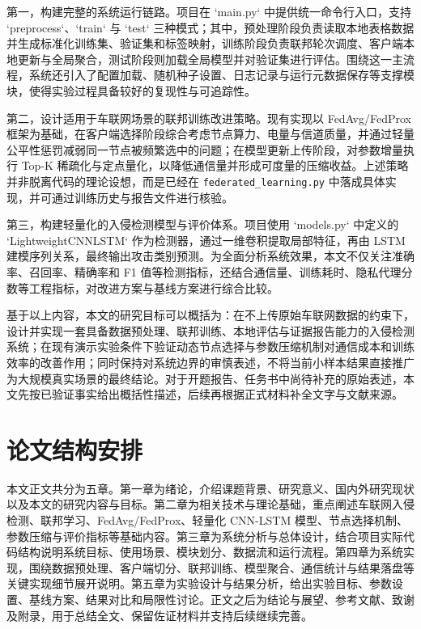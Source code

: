 第一，构建完整的系统运行链路。项目在 `main.py` 中提供统一命令行入口，支持 `preprocess`、`train` 与 `test` 三种模式；其中，预处理阶段负责读取本地表格数据并生成标准化训练集、验证集和标签映射，训练阶段负责联邦轮次调度、客户端本地更新与全局聚合，测试阶段则加载全局模型并对验证集进行评估。围绕这一主流程，系统还引入了配置加载、随机种子设置、日志记录与运行元数据保存等支撑模块，使得实验过程具备较好的复现性与可追踪性。

第二，设计适用于车联网场景的联邦训练改进策略。现有实现以 FedAvg/FedProx 框架为基础，在客户端选择阶段综合考虑节点算力、电量与信道质量，并通过轻量公平性惩罚减弱同一节点被频繁选中的问题；在模型更新上传阶段，对参数增量执行 Top-K 稀疏化与定点量化，以降低通信量并形成可度量的压缩收益。上述策略并非脱离代码的理论设想，而是已经在 \texttt{federated\_learning.py} 中落成具体实现，并可通过训练历史与报告文件进行核验。

第三，构建轻量化的入侵检测模型与评价体系。项目使用 `models.py` 中定义的 `LightweightCNNLSTM` 作为检测器，通过一维卷积提取局部特征，再由 LSTM 建模序列关系，最终输出攻击类别预测。为全面分析系统效果，本文不仅关注准确率、召回率、精确率和 F1 值等检测指标，还结合通信量、训练耗时、隐私代理分数等工程指标，对改进方案与基线方案进行综合比较。

基于以上内容，本文的研究目标可以概括为：在不上传原始车联网数据的约束下，设计并实现一套具备数据预处理、联邦训练、本地评估与证据报告能力的入侵检测系统；在现有演示实验条件下验证动态节点选择与参数压缩机制对通信成本和训练效率的改善作用；同时保持对系统边界的审慎表述，不将当前小样本结果直接推广为大规模真实场景的最终结论。对于开题报告、任务书中尚待补充的原始表述，本文先按已验证事实给出概括性描述，后续再根据正式材料补全文字与文献来源。

\section{论文结构安排}
\label{sec:introduction-structure}

本文正文共分为五章。第一章为绪论，介绍课题背景、研究意义、国内外研究现状以及本文的研究内容与目标。第二章为相关技术与理论基础，重点阐述车联网入侵检测、联邦学习、FedAvg/FedProx、轻量化 CNN-LSTM 模型、节点选择机制、参数压缩与评价指标等基础内容。第三章为系统分析与总体设计，结合项目实际代码结构说明系统目标、使用场景、模块划分、数据流和运行流程。第四章为系统实现，围绕数据预处理、客户端切分、联邦训练、模型聚合、通信统计与结果落盘等关键实现细节展开说明。第五章为实验设计与结果分析，给出实验目标、参数设置、基线方案、结果对比和局限性讨论。正文之后为结论与展望、参考文献、致谢及附录，用于总结全文、保留佐证材料并支持后续继续完善。
